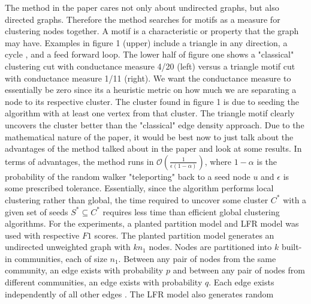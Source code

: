 \documentclass[12pt]{article}
\theoremstyle{remark}
\begin{document}
The method in the paper cares not only about undirected graphs, but also directed graphs. Therefore the method searches for motifs as a measure for clustering nodes together. A motif is a characteristic or property that the graph may have. Examples in figure 1 (upper) include a triangle in any direction, a cycle , and a feed forward loop. The lower half of figure one shows a "classical" clustering cut with conductance measure 4/20 (left) versus a triangle motif cut with conductance measure 1/11 (right). We want the conductance measure to essentially be zero since its a heuristic metric on how much we are separating a node to its respective cluster. The cluster found in figure 1 is due to seeding the algorithm with at least one vertex from that cluster. The triangle motif clearly uncovers the cluster better than the "classical" edge density approach. Due to the mathematical nature of the paper, it would be best now to just talk about the advantages of the method talked about in the paper and look at some results. In terms of advantages, the method runs in $\mathcal{O}(\frac{1}{\epsilon(1-\alpha)})$, where $1 - \alpha$ is the probability of the random walker "teleporting" back to a seed node $u$ and $\epsilon$ is some prescribed tolerance. Essentially, since the algorithm performs local clustering rather than global, the time required to uncover some cluster $C^*$ with a given set of seeds $S^* \subseteq C^*$ requires less time than efficient global clustering algorithms. For the experiments, a planted partition model and LFR model was used with respective $F1$ scores. The planted partition model generates
an undirected unweighted graph with $kn_1$ nodes. Nodes are partitioned into $k$ built-in communities, each of size $n_1$. Between any
pair of nodes from the same community, an edge exists with probability $p$ and between any pair of nodes from different communities,
an edge exists with probability $q$. Each edge exists independently
of all other edges \cite{paper}. The LFR model also generates random 
\end{document}
